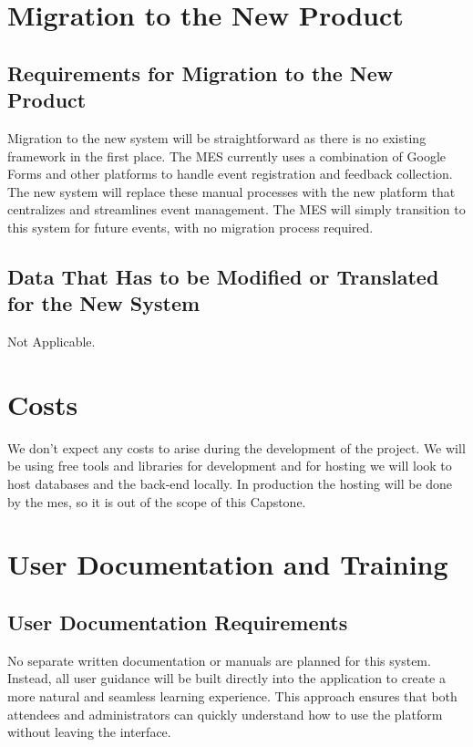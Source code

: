 \documentclass[12pt]{article}
\begin{document}
\section{Migration to the New Product}
\subsection{Requirements for Migration to the New Product}
Migration to the new system will be straightforward as there is no existing framework in the first place. The MES currently uses a combination of Google Forms and other platforms to handle event registration and feedback collection. The new system will replace these manual processes with the new platform that centralizes and streamlines event management. The MES will simply transition to this system for future events, with no migration process required.
\subsection{Data That Has to be Modified or Translated for the New System}
Not Applicable.

\section{Costs}
We don't expect any costs to arise during the development of the project. We will be using free tools and libraries for
development and for hosting we will look to host databases and the back-end locally. In production the hosting will be
done by the \gls{mes}, so it is out of the scope of this Capstone.

\section{User Documentation and Training}

\subsection{User Documentation Requirements}

No separate written documentation or manuals are planned for this system.
Instead, all user guidance will be built directly into the application to create a more natural and seamless learning experience.
This approach ensures that both attendees and administrators can quickly understand how to use the platform without leaving the interface.
\end{document}
